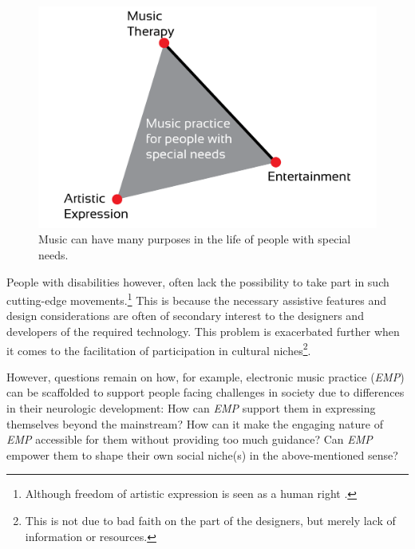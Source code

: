 \documentclass{chi-ext}
\begin{document}
\begin{multicols}{2}

\begin{figure}
	\includegraphics[width=\columnwidth]{media/musicThreefold.pdf}
	\caption{Music can have many purposes in the life of people with special needs.}
	\label{fig:media_musicThreefold}
\end{figure}

People with disabilities however, often lack the possibility to take part in such cutting-edge movements.\footnote{Although freedom of artistic expression is seen as a human right \cite{shaheed2013-rep}.} 
This is because the necessary assistive features and design considerations are often of secondary interest to the designers and developers of the required technology. 
This problem is exacerbated further when it comes to the facilitation of participation in cultural niches\footnote{This is not due to bad faith on the part of the designers, but merely lack of information or resources.}.

However, questions remain on how, for example, electronic music practice (\emph{EMP}) can be scaffolded to support people facing challenges in society due to differences in their neurologic development:
How can \emph{EMP} support them in expressing themselves beyond the mainstream? 
How can it make the engaging nature of \emph{EMP} accessible for them without providing too much guidance?
Can \emph{EMP} empower them to shape their own social niche(s) in the above-mentioned sense?


\end{multicols}
\end{document}
